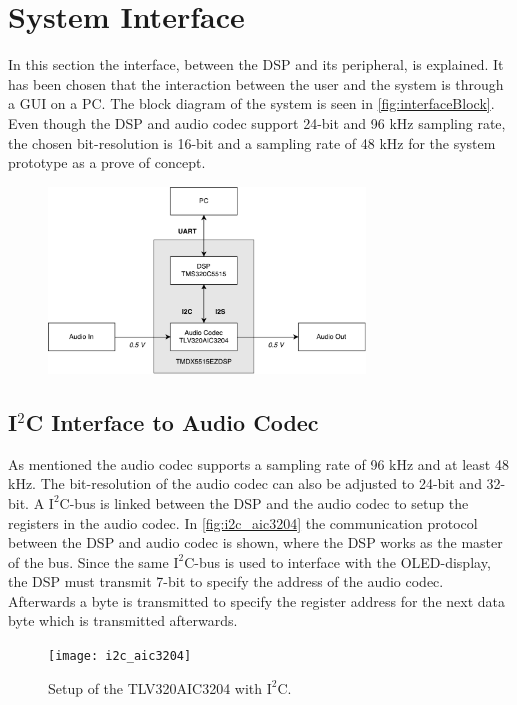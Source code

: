 \section{System Interface}

In this section the interface, between the DSP and its peripheral, is explained. It has been chosen that the interaction between the user and the system is through a GUI on a PC. The block diagram of the system is seen in \autoref{fig:interfaceBlock}. Even though the DSP and audio codec support 24-bit and 96 kHz sampling rate, the chosen bit-resolution is 16-bit and a sampling rate of 48 kHz for the system prototype as a prove of concept.

\begin{figure}[H]
\centering
\includegraphics[width=0.75\textwidth]{figures/interfaceBlock.pdf}
\caption{}
\label{fig:interfaceBlock}
\end{figure}

\subsection*{I$^2$C Interface to Audio Codec}

As mentioned the audio codec supports a sampling rate of 96 kHz and at least 48 kHz. The bit-resolution of the audio codec can also be adjusted to 24-bit and 32-bit. A $\text{I}^2$C-bus is linked between the DSP and the audio codec to setup the registers in the audio codec. In \autoref{fig:i2c_aic3204} the communication protocol between the DSP and audio codec is shown, where the DSP works as the master of the bus. Since the same $\text{I}^2$C-bus is used to interface with the OLED-display, the DSP must transmit 7-bit to specify the address of the audio codec. Afterwards a byte is transmitted to specify the register address for the next data byte which is transmitted afterwards.

\begin{figure}[H]
\centering
\texttt{[image: i2c\_aic3204]}
\caption{Setup of the TLV320AIC3204 with $\text{I}^2$C.}
\label{fig:i2c_aic3204}
\end{figure}  

